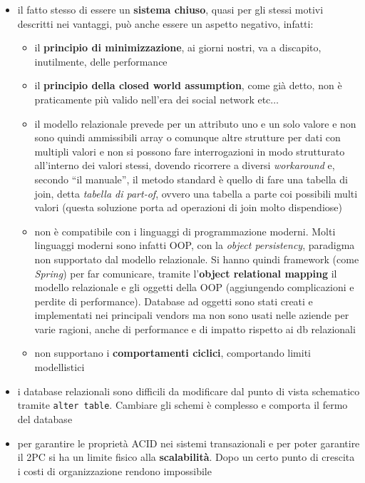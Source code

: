 \documentclass[a4paper,12pt, oneside]{book}
\begin{document}
\begin{itemize}
  \item il fatto stesso di essere un \textbf{sistema chiuso}, quasi per gli
  stessi motivi descritti nei vantaggi, può anche essere un aspetto negativo,
  infatti:
  \begin{itemize}
    \item il \textbf{principio di minimizzazione}, ai giorni nostri, va a
    discapito, inutilmente, delle performance 
    \item il \textbf{principio della closed world assumption}, come già detto,
    non è praticamente più valido nell'era dei social network etc$\ldots$
    \item il modello relazionale prevede per un attributo uno e un solo valore e
    non sono quindi ammissibili array o comunque altre strutture per dati con
    multipli valori e non si possono fare interrogazioni in
    modo strutturato all'interno dei valori stessi, dovendo ricorrere a diversi
    \textit{workaround} e, secondo ``il manuale'', il metodo standard è quello
    di fare una tabella di join, detta \textit{tabella di part-of}, ovvero una
    tabella a parte coi possibili multi valori (questa soluzione porta ad
    operazioni di join molto dispendiose)
    \item non è compatibile con i linguaggi di programmazione moderni. Molti
    linguaggi moderni sono infatti OOP, con la \textit{object persistency},
    paradigma non supportato dal modello relazionale. Si hanno quindi framework
    (come \textit{Spring}) per far comunicare, tramite l'\textbf{object
      relational mapping} il modello relazionale e gli
    oggetti della OOP (aggiungendo complicazioni e perdite di
    performance). Database ad oggetti sono stati creati e implementati nei
    principali vendors ma non sono usati nelle aziende per varie ragioni, anche
    di performance e di impatto rispetto ai db relazionali
    \item non supportano i \textbf{comportamenti ciclici}, comportando limiti
    modellistici
  \end{itemize}
  \item i database relazionali sono difficili da modificare dal punto di vista
  schematico tramite \texttt{alter table}. Cambiare gli schemi è complesso e
  comporta il fermo del database
  \item per garantire le proprietà ACID nei sistemi transazionali e per poter
  garantire il 2PC si ha un limite fisico alla \textbf{scalabilità}. Dopo un
  certo punto di crescita i costi di organizzazione rendono impossibile

\end{itemize}
\end{document}
